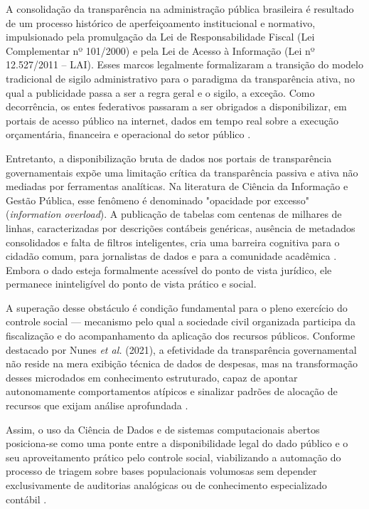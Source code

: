 \documentclass[
    12pt,               %
    openright,          %
    oneside,            %
    a4paper,            %
    chapter=TITLE,      %
    sumario=tradicional,%
    english,            %
    brazilian,          %
 ]{abntex2}
\begin{document}
A consolidação da transparência na administração pública brasileira é resultado de um processo histórico de aperfeiçoamento institucional e normativo, impulsionado pela promulgação da Lei de Responsabilidade Fiscal (Lei Complementar nº 101/2000) e pela Lei de Acesso à Informação (Lei nº 12.527/2011 -- LAI). Esses marcos legalmente formalizaram a transição do modelo tradicional de sigilo administrativo para o paradigma da transparência ativa, no qual a publicidade passa a ser a regra geral e o sigilo, a exceção. Como decorrência, os entes federativos passaram a ser obrigados a disponibilizar, em portais de acesso público na internet, dados em tempo real sobre a execução orçamentária, financeira e operacional do setor público \cite{cavalcanti2014, pereira2025}.

Entretanto, a disponibilização bruta de dados nos portais de transparência governamentais expõe uma limitação crítica da transparência passiva e ativa não mediadas por ferramentas analíticas. Na literatura de Ciência da Informação e Gestão Pública, esse fenômeno é denominado "opacidade por excesso" (\textit{information overload}). A publicação de tabelas com centenas de milhares de linhas, caracterizadas por descrições contábeis genéricas, ausência de metadados consolidados e falta de filtros inteligentes, cria uma barreira cognitiva para o cidadão comum, para jornalistas de dados e para a comunidade acadêmica \cite{cavalcanti2014, nunes2021}. Embora o dado esteja formalmente acessível do ponto de vista jurídico, ele permanece ininteligível do ponto de vista prático e social.

A superação desse obstáculo é condição fundamental para o pleno exercício do controle social — mecanismo pelo qual a sociedade civil organizada participa da fiscalização e do acompanhamento da aplicação dos recursos públicos. Conforme destacado por Nunes \textit{et al.} (2021), a efetividade da transparência governamental não reside na mera exibição técnica de dados de despesas, mas na transformação desses microdados em conhecimento estruturado, capaz de apontar autonomamente comportamentos atípicos e sinalizar padrões de alocação de recursos que exijam análise aprofundada \cite{nunes2021}.

Assim, o uso da Ciência de Dados e de sistemas computacionais abertos posiciona-se como uma ponte entre a disponibilidade legal do dado público e o seu aproveitamento prático pelo controle social, viabilizando a automação do processo de triagem sobre bases populacionais volumosas sem depender exclusivamente de auditorias analógicas ou de conhecimento especializado contábil \cite{nunes2021, pereira2025}.
\end{document}
